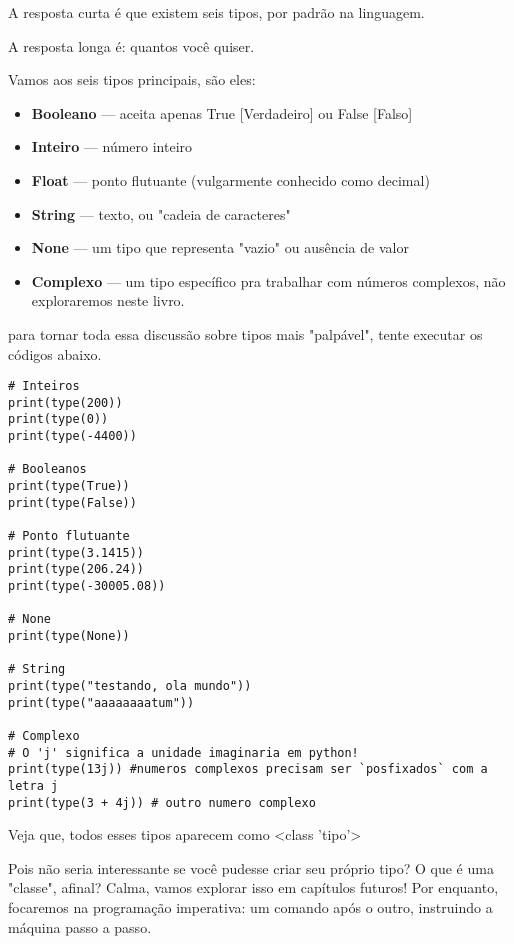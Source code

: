 \documentclass[12pt]{book}
\begin{document}
	A resposta curta é que existem seis tipos, por padrão na linguagem.
	
	A resposta longa é: quantos você quiser.
	
	Vamos aos seis tipos principais, são eles:
	\begin{tcolorbox}[colback=gray!10, colframe=black, title={\large\bfseries Lista de tipos principais}]
		\begin{itemize}
			\item \textbf{Booleano} --- aceita apenas True [Verdadeiro] ou False [Falso]
			\item \textbf{Inteiro} --- número inteiro
			\item \textbf{Float} --- ponto flutuante (vulgarmente conhecido como decimal)
			\item \textbf{String} --- texto, ou "cadeia de caracteres"
			\item \textbf{None} --- um tipo que representa "vazio" ou ausência de valor
			\item \textbf{Complexo} --- um tipo específico pra trabalhar com números complexos, não exploraremos neste livro.
		\end{itemize}		
	\end{tcolorbox}
	
	
	para tornar toda essa discussão sobre tipos mais "palpável", tente executar os códigos abaixo.
	
	\begin{lstlisting}[caption={Verificando os tipos de variáveis em python}] 
# Inteiros
print(type(200))
print(type(0))
print(type(-4400))

# Booleanos
print(type(True))
print(type(False))

# Ponto flutuante
print(type(3.1415))
print(type(206.24))
print(type(-30005.08))

# None
print(type(None))

# String
print(type("testando, ola mundo"))
print(type("aaaaaaaatum"))

# Complexo
# O 'j' significa a unidade imaginaria em python!
print(type(13j)) #numeros complexos precisam ser `posfixados` com a letra j
print(type(3 + 4j)) # outro numero complexo\end{lstlisting}
	
	Veja que, todos esses tipos aparecem como <class 'tipo'> \newline
	
	Pois não seria interessante se você pudesse criar seu próprio tipo? O que é uma "classe", afinal? \newline
	Calma, vamos explorar isso em capítulos futuros! Por enquanto, focaremos na programação imperativa: um comando após o outro, instruindo a máquina passo a passo.
	
\end{document}
